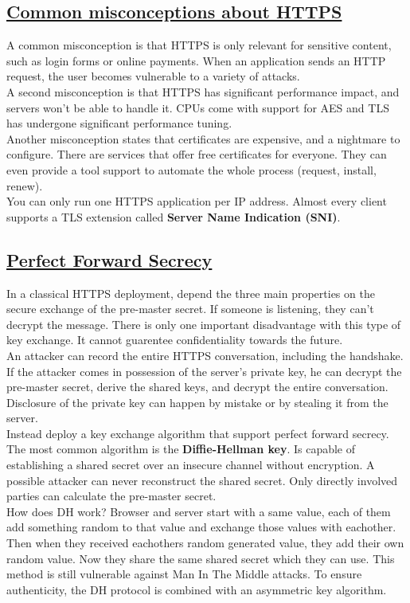 \documentclass[titlepage]{article}
\begin{document}
    \subsection{\href{https://youtu.be/mEZx8e-1XC0}{Common misconceptions about HTTPS}}
    A common misconception is that HTTPS is only relevant for sensitive content, such as login forms or online payments. When an application sends an HTTP request, the user becomes vulnerable to a variety of attacks.\\
    A second misconception is that HTTPS has significant performance impact, and servers won't be able to handle it. CPUs come with support for AES and TLS has undergone significant performance tuning.\\
    Another misconception states that certificates are expensive, and a nightmare to configure. There are services that offer free certificates for everyone.  They can even provide a tool support to automate the whole process (request, install, renew).\\
    You can only run one HTTPS application per IP address. Almost every client supports a TLS extension called \textbf{Server Name Indication (SNI)}. 
    \subsection{\href{https://youtu.be/CGWqpGHkXbw}{Perfect Forward Secrecy}}
    In a classical HTTPS deployment, depend the three main properties on the secure exchange of the pre-master secret. If someone is listening, they can't decrypt the message. There is only one important disadvantage with this type of key exchange. It cannot guarentee confidentiality towards the future.\\
    An attacker can record the entire HTTPS conversation, including the handshake. If the attacker comes in possession of the server's private key, he can decrypt the pre-master secret, derive the shared keys, and decrypt the entire conversation. Disclosure of the private key can happen by mistake or by stealing it from the server.\\
    Instead deploy a key exchange algorithm that support perfect forward secrecy. The most common algorithm is the \textbf{Diffie-Hellman key}. Is capable of establishing a shared secret over an insecure channel without encryption. A possible attacker can never reconstruct the shared secret. Only directly involved parties can calculate the pre-master secret.\\
    How does DH work? Browser and server start with a same value, each of them add something random to that value and exchange those values with eachother. Then when they received eachothers random generated value, they add their own random value. Now they share the same shared secret which they can use. This method is still vulnerable against Man In The Middle attacks. To ensure authenticity, the DH protocol is combined with an asymmetric key algorithm.
\end{document}
